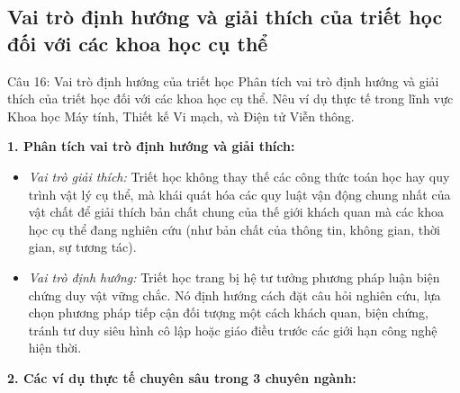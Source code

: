 \documentclass[12pt,a4paper]{article}
\begin{document}
{\subsection{Vai trò định hướng và giải thích của triết học đối với các khoa học cụ thể}

\begin{questionbox}{Câu 16: Vai trò định hướng của triết học}
Phân tích vai trò định hướng và giải thích của triết học đối với các khoa học cụ thể. Nêu ví dụ thực tế trong lĩnh vực Khoa học Máy tính, Thiết kế Vi mạch, và Điện tử Viễn thông.
\end{questionbox}

\noindent
\textbf{1. Phân tích vai trò định hướng và giải thích:}
\begin{itemize}
    \item \textit{Vai trò giải thích:} Triết học không thay thế các công thức toán học hay quy trình vật lý cụ thể, mà khái quát hóa các quy luật vận động chung nhất của vật chất để giải thích bản chất chung của thế giới khách quan mà các khoa học cụ thể đang nghiên cứu (như bản chất của thông tin, không gian, thời gian, sự tương tác).
    \item \textit{Vai trò định hướng:} Triết học trang bị hệ tư tưởng phương pháp luận biện chứng duy vật vững chắc. Nó định hướng cách đặt câu hỏi nghiên cứu, lựa chọn phương pháp tiếp cận đối tượng một cách khách quan, biện chứng, tránh tư duy siêu hình cô lập hoặc giáo điều trước các giới hạn công nghệ hiện thời.
\end{itemize}

\noindent
\textbf{2. Các ví dụ thực tế chuyên sâu trong 3 chuyên ngành:}

}
\end{document}
